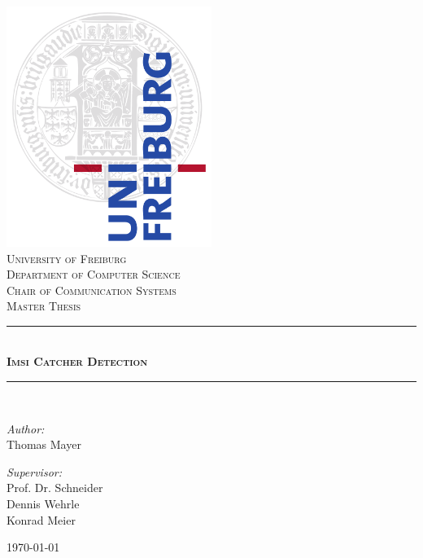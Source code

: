 
\begin{fullsizetitle}
	\thispagestyle{empty}
	\begin{center}
		\vspace{1.5cm}
		\includegraphics[width=0.5\textwidth]{../Images/unisiegel}\\[1cm]

		\textsc{\LARGE University of Freiburg}\\[0.5cm]
		\textsc{Department of Computer Science\\Chair of Communication Systems}\\[2cm]
		\textsc{\LARGE Master Thesis}\\[0.5cm]

		\rule{0.7\linewidth}{0.5mm} \\[0.7cm]
		\textsc{\huge \bfseries Imsi Catcher Detection}\\[0.4cm]
		\rule{0.7\linewidth}{0.5mm} \\[1.5cm]

		\begin{minipage}{0.4\textwidth}
			\begin{flushleft} \large
				\emph{Author:}\\
				Thomas Mayer
			\end{flushleft}
		\end{minipage}
		\begin{minipage}{0.4\textwidth}
			\begin{flushright} \large
				\emph{Supervisor:} \\
				Prof. Dr. Schneider\\
				Dennis Wehrle\\
				Konrad Meier
			\end{flushright}
		\end{minipage}

		\vfill
		{\large \today}
	\end{center}
\end{fullsizetitle}